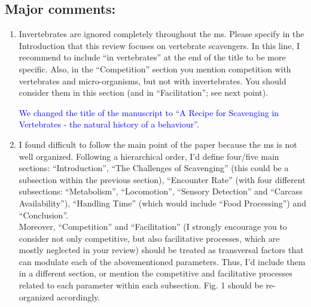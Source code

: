 \documentclass[12pt,letterpaper]{article}
\begin{document}
\subsection{Major comments:}

\begin{enumerate}
\item{Invertebrates are ignored completely throughout the ms.
Please specify in the Introduction that this review focuses on vertebrate scavengers.
In this line, I recommend to include ``in vertebrates'' at the end of the title to be more specific.
Also, in the ``Competition'' section you mention competition with vertebrates and micro-organisms, but not with invertebrates.
You should consider them in this section (and in ``Facilitation''; see next point).}

\textcolor{blue}{We changed the title of the manuscript to ``A Recipe for Scavenging in Vertebrates - the natural history of a behaviour''.}

\item{I found difficult to follow the main point of the paper because the ms is not well organized. Following a hierarchical order, I'd define four/five main sections: ``Introduction'', ``The Challenges of Scavenging'' (this could be a subsection within the previous section), ``Encounter Rate'' (with four different subsections: ``Metabolism'', ``Locomotion'', ``Sensory Detection'' and ``Carcass Availability''), ``Handling Time'' (which would include ``Food Processing'') and ``Conclusion''. \\ 

Moreover, ``Competition'' and ``Facilitation'' (I strongly encourage you to consider not only competitive, but also facilitative processes, which are mostly neglected in your review) should be treated as transversal factors that can modulate each of the abovementioned parameters. Thus, I'd include them in a different section, or mention the competitive and facilitative processes related to each parameter within each subsection. Fig. 1 should be re-organized accordingly.}


\end{enumerate}
\end{document}

